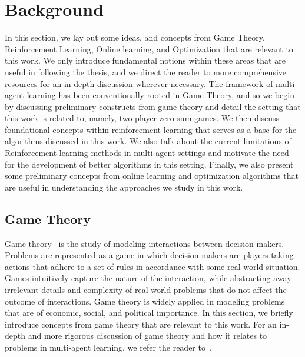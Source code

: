 \chapter{Background}
In this section, we lay out some ideas, and concepts from Game Theory, Reinforcement Learning, Online learning, and Optimization that are relevant to this work.
We only introduce fundamental notions within these areas that are useful in following the thesis, and we direct the reader to more comprehensive resources for an in-depth discussion wherever necessary.
The framework of multi-agent learning has been conventionally rooted in Game Theory, and so we begin by discussing preliminary constructs from game theory and detail the setting that this work is related to, namely, two-player zero-sum games.
We then discuss foundational concepts within reinforcement learning that serves as a base for the algorithms discussed in this work. We also talk about the current limitations of Reinforcement learning methods in multi-agent settings and motivate the need for the development of better algorithms in this setting.
Finally, we also present some preliminary concepts from online learning and optimization algorithms that are useful in understanding the approaches we study in this work.

\section{Game Theory}
Game theory~\cite{osborneintroduction2004} is the study of modeling interactions between
decision-makers.
Problems are represented as a game in which decision-makers are players taking actions that adhere
to a set of rules in accordance with some real-world situation.
Games intuitively capture the nature of the interaction, while abstracting away irrelevant details
and complexity of real-world problems that do not affect the outcome of interactions.
Game theory is widely applied in modeling problems that are of economic, social, and political
importance.
In this section, we briefly introduce concepts from game theory that are relevant to this work.
For an in-depth and more rigorous discussion of game theory and how it relates to problems in multi-agent learning, we refer the reader
to~\cite{nisanAlgorithmic2007a, shohamMultiagent2008}.

